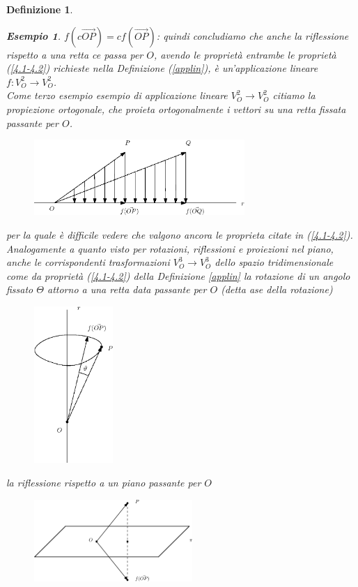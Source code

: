 \documentclass{book}
\newtheorem{definizione}{Definizione}
\newtheorem{esempio}{Esempio}
\begin{document}
\begin{definizione}
\begin{esempio}
    $f(c\vec{OP})=cf(\vec{OP})$: quindi concludiamo che anche la riflessione rispetto a una retta ce passa per
    $O$, avendo le proprietà entrambe le proprietà (\ref{4.1-4.2}) richieste nella Definizione (\ref{applin}),
    è un'applicazione lineare $f:V_O^2\to        V_O^2$.\\
    Come terzo esempio esempio di applicazione lineare $V_O^2\to V_O^2$ citiamo la propiezione ortogonale,
    che proieta ortogonalmente i vettori su una retta fissata passante per $O$.
    \begin{figure}[th]
      \centering
        \includegraphics[width=8cm]{img/finiti/imgex4-2-7.eps}
    \end{figure}
      
    per la quale è difficile vedere che valgono ancora le proprieta citate in (\ref{4.1-4.2}).\\
    Analogamente a quanto visto per rotazioni, riflessioni e proiezioni nel piano, anche le corrispondenti
    trasformazioni $V_O^3\to V_O^3$ dello spazio tridimensionale come da proprietà (\ref{4.1-4.2}) della
    Definizione \ref{applin} la rotazione di un angolo fissato $\Theta$ attorno a una retta data passante per $O$
    (detta ase della rotazione)
    \clearpage
    \begin{figure}[th]
      \centering
        \includegraphics[width=3cm]{img/finiti/imgex4-2-8.eps}
    \end{figure}
    la riflessione rispetto a un piano passante per $O$
    \begin{figure}[th]
      \centering
        \includegraphics[width=6cm]{img/finiti/imgex4-2-9.eps}
    \end{figure}
      

\end{esempio}
\end{definizione}
\end{document}
